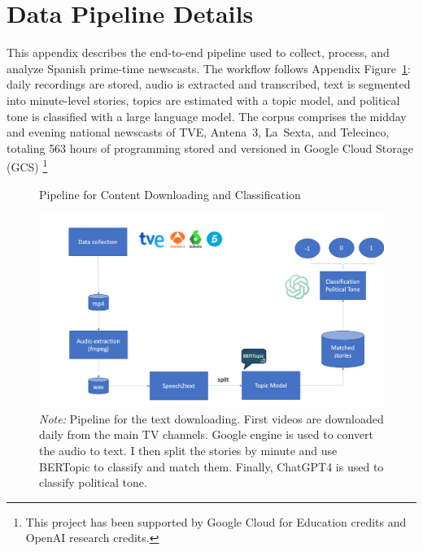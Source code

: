 \documentclass[12pt]{article}
\begin{document}
\parttoc %


\renewcommand\thefigure{\thesection.\arabic{figure}}   
\renewcommand\thetable{\thesection.\arabic{table}}
\setcounter{table}{0}


\clearpage






\section{Data Pipeline  Details}\label{sec:appendix_models}



This appendix describes the end-to-end pipeline used to collect, process, and analyze Spanish prime-time newscasts. The workflow follows Appendix Figure~\ref{fig:pipeline}: daily recordings are stored, audio is extracted and transcribed, text is segmented into minute-level stories, topics are estimated with a topic model, and political tone is classified with a large language model. The corpus comprises the midday and evening national newscasts of TVE, Antena~3, La~Sexta, and Telecinco, totaling {563 hours} of programming stored and versioned in Google Cloud Storage (GCS) \footnote{This project has been supported by Google Cloud for Education credits and OpenAI research credits.} %






\begin{figure}[!htb]
	\centering
	\caption{Pipeline for Content Downloading and Classification }
	\includegraphics[width=150mm]{figures/pipeline3}
	\caption*{\small \textit{Note:} Pipeline for the text downloading. First videos are downloaded daily from the main TV channels. Google engine is used to convert the audio to text. I then split the stories by minute and use BERTopic to classify and match them. Finally, ChatGPT4 is used to classify political tone.}
	\label{fig:pipeline}
\end{figure}
\end{document}
